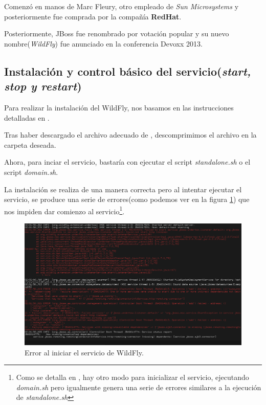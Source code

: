 \documentclass[a4paper, 10pt]{article}
\begin{document}
	Comenzó en manos de Marc Fleury, otro empleado de \textit{Sun Microsystems} y posteriormente fue
	comprada por la compañía \textbf{RedHat}.

	Posteriormente, JBoss fue renombrado por votación popular\cite{WF_vote}\cite{WF_install} y su nuevo
	nombre(\textit{WildFly}) fue anunciado en la conferencia Devoxx 2013.\cite{WF_install}\cite{WF_name}

	\subsection{Instalación y control básico del servicio(\textit{start, stop y restart})}
		Para realizar la instalación del WildFly, nos basamos en las instrucciones detalladas
		en \cite{WF_install}.
		
		Tras haber descargado el archivo adecuado de \cite{WF_download}, descomprimimos el archivo
		en la carpeta deseada.
		
		Ahora, para inciar el servicio, bastaría con ejecutar el script \textit{standalone.sh}
		o el script \textit{domain.sh}.
		
		La instalación se realiza de una manera correcta pero al intentar ejecutar el servicio,
		se produce una serie de errores(como podemos ver en la figura \ref{fig:WF_Fail}) que nos
		impiden dar comienzo al servicio\footnote{Como se detalla en \cite{WF_install}, hay otro
		modo para inicializar el servicio, ejecutando \textit{domain.sh} pero igualmente genera
		una serie de errores similares a la ejecución de \textit{standalone.sh}}.

		\begin{figure}[h!]
			\includegraphics[width=15cm]{Fail_WF.png}
			\caption{Error al iniciar el servicio de WildFly.}
			\label{fig:WF_Fail}
		\end{figure}
\end{document}
